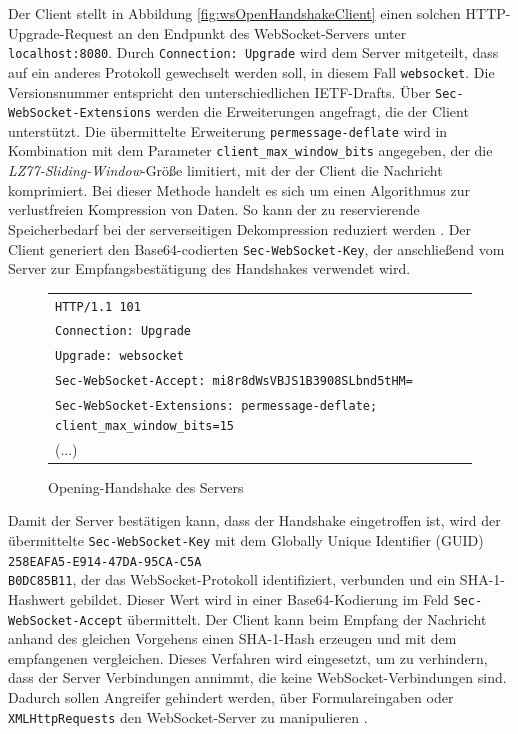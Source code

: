 \documentclass[11pt,a4paper,titlepage]{scrartcl}
\numberwithin{equation}{section}
\begin{document}
\noindent Der Client stellt in Abbildung \ref{fig:wsOpenHandshakeClient} einen solchen HTTP-Upgrade-Request an den Endpunkt des WebSocket-Servers unter \texttt{localhost:8080}. Durch \texttt{Connection: Upgrade} wird dem Server mitgeteilt, dass auf ein anderes Protokoll gewechselt werden soll, in diesem Fall \texttt{websocket}. Die Versionsnummer entspricht den unterschiedlichen IETF-Drafts. Über \texttt{Sec-WebSocket-Extensions} werden die Erweiterungen angefragt, die der Client unterstützt. Die übermittelte Erweiterung \texttt{permessage-deflate} wird in Kombination mit dem Parameter \texttt{client\_max\_window\_bits} angegeben, der die \textit{LZ77-Sliding-Window}-Größe limitiert, mit der der Client die Nachricht komprimiert. Bei dieser Methode handelt es sich um einen Algorithmus zur verlustfreien Kompression von Daten. So kann der zu reservierende Speicherbedarf bei der serverseitigen Dekompression reduziert werden \autocite[18]{yoshino_compression_2015}. Der Client generiert den Base64-codierten \texttt{Sec-WebSocket-Key}, der anschließend vom Server zur Empfangsbestätigung des Handshakes verwendet wird. 

\begin{figure}[ht]
	\begin{center}
		\begin{tabular}{l}
			\texttt{HTTP/1.1 101} \\
			\texttt{Connection: Upgrade} \\
			\texttt{Upgrade: websocket} \\
			\texttt{Sec-WebSocket-Accept: mi8r8dWsVBJS1B3908SLbnd5tHM=}\\
			\texttt{Sec-WebSocket-Extensions: permessage-deflate; client\_max\_window\_bits=15}\\
			(...)\vspace{-5mm}
		\end{tabular}
	\end{center}
	\caption{Opening-Handshake des Servers}
	\label{fig:wsOpenHandshakeServer}
\end{figure}

\noindent Damit der Server bestätigen kann, dass der Handshake eingetroffen ist, wird der  übermittelte \texttt{Sec-WebSocket-Key} mit dem Globally Unique Identifier (GUID) \texttt{258EAFA5-E914-47DA-95CA-C5A\\B0DC85B11}, der das WebSocket-Protokoll identifiziert, verbunden und ein SHA-1-Hashwert gebildet. Dieser Wert wird in einer Base64-Kodierung im Feld \texttt{Sec-WebSocket-Accept} übermittelt. Der Client kann beim Empfang der Nachricht anhand des gleichen Vorgehens einen SHA-1-Hash erzeugen und mit dem empfangenen vergleichen. Dieses Verfahren wird eingesetzt, um zu verhindern, dass der Server Verbindungen annimmt, die keine WebSocket-Verbindungen sind. Dadurch sollen Angreifer gehindert werden, über Formulareingaben oder \texttt{XMLHttpRequests} den WebSocket-Server zu manipulieren \autocite[7]{fette_websocket_2011}.
\end{document}
